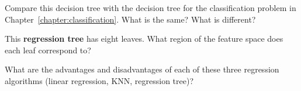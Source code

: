 \begin{question}{}
Compare this decision tree with the decision tree for the classification problem in Chapter~\ref{chapter:classification}. What is the same? What is different?
\end{question}

\begin{question}{}
This \textbf{regression tree} has eight leaves. What region of the feature space does each leaf correspond to?
\end{question}

\begin{question}{}
What are the advantages and disadvantages of each of these three regression algorithms (linear regression, KNN, regression tree)?
\end{question}

